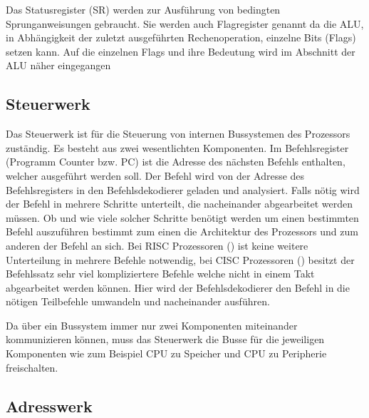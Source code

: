 \documentclass[12pt]{article}
\begin{document}
Das Statusregister (SR) werden zur Ausführung von bedingten Sprunganweisungen gebraucht. Sie werden auch Flagregister genannt da die ALU, in Abhängigkeit der zuletzt ausgeführten Rechenoperation, einzelne Bits (Flags) setzen kann. Auf die einzelnen Flags und ihre Bedeutung wird im Abschnitt der ALU näher eingegangen
\subsection{Steuerwerk}
Das Steuerwerk ist für die Steuerung von internen Bussystemen des Prozessors zuständig. Es besteht aus zwei wesentlichten Komponenten. Im Befehlsregister (Programm Counter bzw. PC) ist die Adresse des nächsten Befehls enthalten, welcher ausgeführt werden soll. Der Befehl wird von der Adresse des Befehlsregisters in den Befehlsdekodierer geladen und analysiert. Falls nötig wird der Befehl in mehrere Schritte unterteilt, die nacheinander abgearbeitet werden müssen. Ob und wie viele solcher Schritte benötigt werden um einen bestimmten Befehl auszuführen bestimmt zum einen die Architektur des Prozessors und zum anderen der Befehl an sich. Bei RISC Prozessoren 
() ist keine weitere Unterteilung in mehrere Befehle notwendig, bei CISC Prozessoren () besitzt der Befehlssatz sehr viel kompliziertere Befehle welche nicht in einem Takt abgearbeitet werden können. Hier wird der Befehlsdekodierer den Befehl in die nötigen Teilbefehle umwandeln und nacheinander ausführen.




Da über ein Bussystem immer nur zwei Komponenten miteinander kommunizieren können, muss das Steuerwerk die Busse für die jeweiligen Komponenten wie zum Beispiel CPU zu Speicher und CPU zu Peripherie freischalten. 
\cite{computerarchitecture2007}

%
\subsection{Adresswerk}
\end{document}
